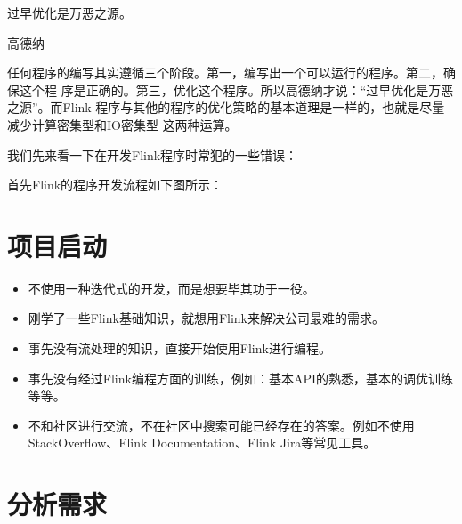 \documentclass[cn,11pt,chinese]{elegantbook}
\begin{document}
\epigraph{过早优化是万恶之源。}{高德纳}

任何程序的编写其实遵循三个阶段。第一，编写出一个可以运行的程序。第二，确保这个程
序是正确的。第三，优化这个程序。所以高德纳才说：“过早优化是万恶之源”。而Flink
程序与其他的程序的优化策略的基本道理是一样的，也就是尽量减少计算密集型和IO密集型
这两种运算。

我们先来看一下在开发Flink程序时常犯的一些错误：

首先Flink的程序开发流程如下图所示：


\section{项目启动}

\begin{itemize}
\item 不使用一种迭代式的开发，而是想要毕其功于一役。
\item 刚学了一些Flink基础知识，就想用Flink来解决公司最难的需求。
\item 事先没有流处理的知识，直接开始使用Flink进行编程。
\item 事先没有经过Flink编程方面的训练，例如：基本API的熟悉，基本的调优训练等等。
\item 不和社区进行交流，不在社区中搜索可能已经存在的答案。例如不使用
  StackOverflow、Flink Documentation、Flink Jira等常见工具。
\end{itemize}

\section{分析需求}
\end{document}
